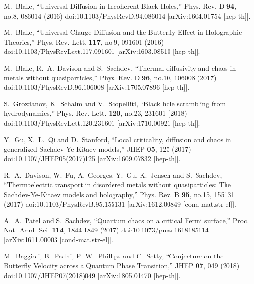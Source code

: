 \documentclass[preprintnumbers,aps,prd,longbibliography,nofootinbib,nobibnotes,amsmath,amssymb]{revtex4}
\begin{document}
\begin{thebibliography}{99}
M.~Blake,
``Universal Diffusion in Incoherent Black Holes,''
Phys. Rev. D \textbf{94}, no.8, 086014 (2016)
doi:10.1103/PhysRevD.94.086014
[arXiv:1604.01754 [hep-th]].

M.~Blake,
``Universal Charge Diffusion and the Butterfly Effect in Holographic Theories,''
Phys. Rev. Lett. \textbf{117}, no.9, 091601 (2016)
doi:10.1103/PhysRevLett.117.091601
[arXiv:1603.08510 [hep-th]].

M.~Blake, R.~A.~Davison and S.~Sachdev,
``Thermal diffusivity and chaos in metals without quasiparticles,''
Phys. Rev. D \textbf{96}, no.10, 106008 (2017)
doi:10.1103/PhysRevD.96.106008
[arXiv:1705.07896 [hep-th]].

S.~Grozdanov, K.~Schalm and V.~Scopelliti,
``Black hole scrambling from hydrodynamics,''
Phys. Rev. Lett. \textbf{120}, no.23, 231601 (2018)
doi:10.1103/PhysRevLett.120.231601
[arXiv:1710.00921 [hep-th]].


Y.~Gu, X.~L.~Qi and D.~Stanford,
``Local criticality, diffusion and chaos in generalized Sachdev-Ye-Kitaev models,''
JHEP \textbf{05}, 125 (2017)
doi:10.1007/JHEP05(2017)125
[arXiv:1609.07832 [hep-th]].

R.~A.~Davison, W.~Fu, A.~Georges, Y.~Gu, K.~Jensen and S.~Sachdev,
``Thermoelectric transport in disordered metals without quasiparticles: The Sachdev-Ye-Kitaev models and holography,''
Phys. Rev. B \textbf{95}, no.15, 155131 (2017)
doi:10.1103/PhysRevB.95.155131
[arXiv:1612.00849 [cond-mat.str-el]].

A.~A.~Patel and S.~Sachdev,
``Quantum chaos on a critical Fermi surface,''
Proc. Nat. Acad. Sci. \textbf{114}, 1844-1849 (2017)
doi:10.1073/pnas.1618185114
[arXiv:1611.00003 [cond-mat.str-el]].


M.~Baggioli, B.~Padhi, P.~W.~Phillips and C.~Setty,
``Conjecture on the Butterfly Velocity across a Quantum Phase Transition,''
JHEP \textbf{07}, 049 (2018)
doi:10.1007/JHEP07(2018)049
[arXiv:1805.01470 [hep-th]].



\end{thebibliography}
\end{document}

